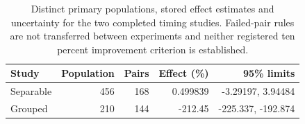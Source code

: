 \begin{table}[htbp]\centering\footnotesize
\caption{Distinct primary populations, stored effect estimates and uncertainty for the two completed timing studies. Failed-pair rules are not transferred between experiments and neither registered ten percent improvement criterion is established.}\label{tab:main-results}
\begin{tabularx}{\textwidth}{@{}>{\raggedright\arraybackslash}Xrrrr@{}}\toprule
Study & Population & Pairs & Effect (\%) & 95\% limits\\\midrule
Separable & 456 & 168 & 0.\allowbreak{}499839 & -3.\allowbreak{}29197, 3.\allowbreak{}94484\\
Grouped & 210 & 144 & -212.\allowbreak{}45 & -225.\allowbreak{}337, -192.\allowbreak{}874\\
\bottomrule\end{tabularx}
\end{table}
